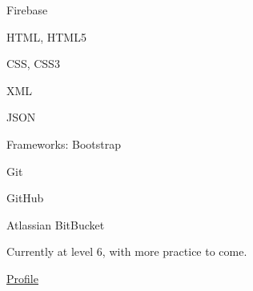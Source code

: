 \documentclass[]{deedy-resume-openfont}
\begin{document}
\begin{tightemize}
\item Firebase
\end{tightemize}
\sectionsep

\begin{tightemize}
\item HTML, HTML5
\item CSS, CSS3
\item XML
\item JSON
\item Frameworks: Bootstrap
\end{tightemize}
\sectionsep

\begin{tightemize}
\item Git
\item GitHub
\item Atlassian BitBucket
\end{tightemize}
\sectionsep

\begin{tightemize}
\item Currently at level 6, with more practice to come.
\item \href{https://www.codewars.com/users/sirkoik}{\underline{Profile}}
\end{tightemize}


\end{document}
